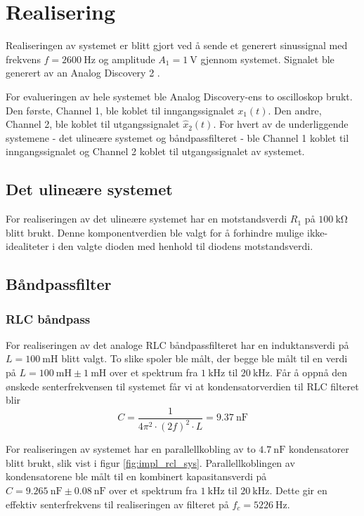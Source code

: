 \section{Realisering}
\label{realiseringOgTest}

Realiseringen av systemet er blitt gjort ved å sende et generert sinussignal 
med frekvens $f = \SI{2600}{\hertz}$ og amplitude $A_1 = \SI{1}{\volt}$ gjennom systemet.
Signalet ble generert av an Analog Discovery 2 \cite{analog_discovery}. 

For evalueringen av hele systemet ble Analog Discovery-ens to oscilloskop brukt. Den første, Channel 1,
ble koblet til inngangssignalet $x_1(t)$. Den andre, Channel 2, ble koblet 
til utgangssignalet $\hat{x}_2(t)$.
For hvert av de underliggende systemene - det ulineære systemet og båndpassfilteret - ble 
Channel 1 koblet til inngangssignalet og Channel 2 koblet til utgangssignalet av systemet.

\subsection{Det ulineære systemet}
For realiseringen av det ulineære systemet har en motstandsverdi $R_1$ på $\SI{100}{\kilo\ohm}$ blitt brukt. Denne komponentverdien 
ble valgt for å forhindre mulige ikke-idealiteter i den valgte dioden med henhold til diodens motstandsverdi.

\subsection{Båndpassfilter}

\subsubsection{RLC båndpass}
For realiseringen av det analoge RLC båndpassfilteret har en induktansverdi på $L = \SI{100}{\milli\henry}$ blitt valgt. To slike spoler ble 
målt, der begge ble målt til en verdi på $L = \SI{100}{\milli\henry} \pm \SI{1}{\milli\henry}$ over et spektrum fra $\SI{1}{\kilo\hertz}$ til $\SI{20}{\kilo\hertz}$. 
Får å oppnå den ønskede senterfrekvensen til systemet får vi at kondensatorverdien til 
RLC filteret blir 
\[
    C = \frac{1}{4\pi^2 \cdot (2f)^2 \cdot L} = \SI{9.37}{\nano\farad}
\]

For realiseringen av systemet har en parallellkobling av to $\SI{4.7}{\nano\farad}$
kondensatorer blitt brukt, slik vist i figur \ref{fig:impl_rcl_sys}.
Parallellkoblingen av kondensatorene ble målt til en kombinert kapasitansverdi på $C = \SI{9.265}{\nano\farad} \pm \SI{0.08}{\nano\farad}$ over et spektrum fra $\SI{1}{\kilo\hertz}$ til $\SI{20}{\kilo\hertz}$.
Dette gir en effektiv senterfrekvens til realiseringen av filteret på $f_c = \SI{5226}{\hertz}$.

